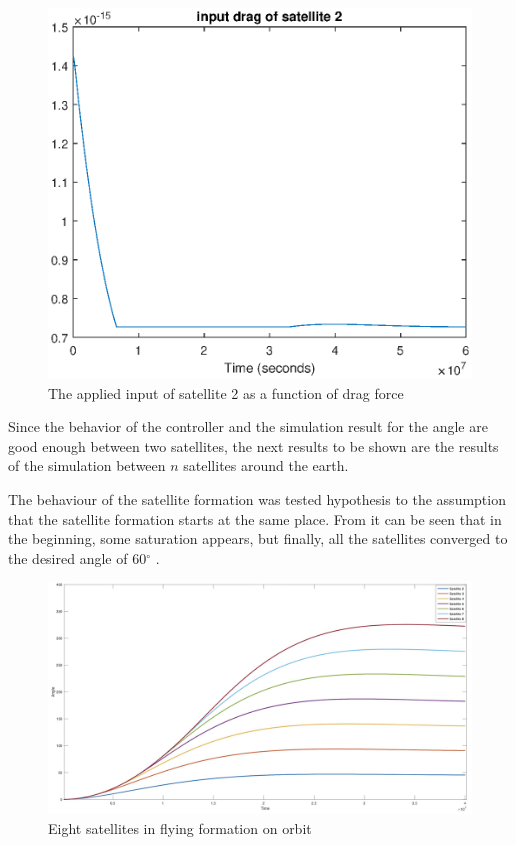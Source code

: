 %
\begin{figure}[H]
	\centering
	\includegraphics[width=0.9\linewidth]
	{figures/input_drag_sat2.eps}
	\caption{The applied input of satellite 2 as a function of drag force  }
	\label{fig:distancecontrol4}
\end{figure}
%
Since the behavior of the controller and the simulation result for the angle are  good enough between two satellites, the next results to be shown are the results of the simulation between $n$ satellites around the earth. 

The behaviour of the satellite formation was tested hypothesis to the assumption that the satellite formation starts at the same place. From  it can be seen that in the beginning, some saturation appears, but finally, all the satellites converged to the desired angle of 60$^{\circ}$ .
\begin{figure}[H]
	\centering
	\includegraphics[width=1\linewidth]{figures/form_sat}
	\caption{Eight satellites in flying formation on orbit}
	\label{fig:forr}
\end{figure}
